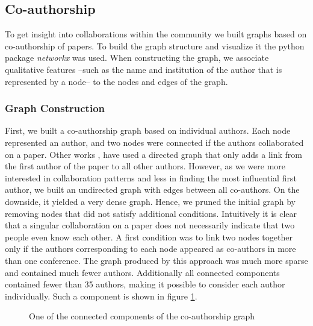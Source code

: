 \documentclass[article,twocolumn]{IEEEtran}
\begin{document}
    \hypertarget{co-authorship}{%
\subsection{Co-authorship}\label{co-authorship}}

To get insight into collaborations within the community we built graphs
based on co-authorship of papers. To build the graph structure and
visualize it the python package \emph{networkx} was used. When
constructing the graph, we associate qualitative features --such as the
name and institution of the author that is represented by a node-- to
the nodes and edges of the graph.

\hypertarget{graph-construction}{%
\subsubsection{Graph Construction}\label{graph-construction}}

First, we built a co-authorship graph based on individual authors. Each
node represented an author, and two nodes were connected if the authors
collaborated on a paper. Other works \cite{cheong2009social},
\cite{hesford2006management} have used a directed graph that only adds a
link from the first author of the paper to all other authors. However,
as we were more interested in collaboration patterns and less in finding
the most influential first author, we built an undirected graph with
edges between all co-authors. On the downside, it yielded a very dense
graph. Hence, we pruned the initial graph by removing nodes that did not
satisfy additional conditions. Intuitively it is clear that a singular
collaboration on a paper does not necessarily indicate that two people
even know each other. A first condition was to link two nodes together
only if the authors corresponding to each node appeared as co-authors in
more than one conference. The graph produced by this approach was much
more sparse and contained much fewer authors. Additionally all connected
components contained fewer than 35 authors, making it possible to
consider each author individually. Such a component is shown in figure
\ref{fig_plot}.


    \begin{figure}
        \begin{center}\end{center}
        \caption{One of the connected components of the co-authorship graph}
        \label{fig_plot}
    \end{figure}
    
\end{document}
